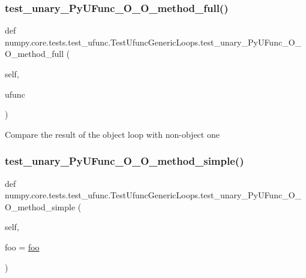 \subsubsection{\texorpdfstring{test\+\_\+unary\+\_\+\+Py\+U\+Func\+\_\+\+O\+\_\+\+O\+\_\+method\+\_\+full()}{test\_unary\_PyUFunc\_O\_O\_method\_full()}}
{\footnotesize\ttfamily def numpy.\+core.\+tests.\+test\+\_\+ufunc.\+Test\+Ufunc\+Generic\+Loops.\+test\+\_\+unary\+\_\+\+Py\+U\+Func\+\_\+\+O\+\_\+\+O\+\_\+method\+\_\+full (\begin{DoxyParamCaption}\item[{}]{self,  }\item[{}]{ufunc }\end{DoxyParamCaption})}

\begin{DoxyVerb}Compare the result of the object loop with non-object one\end{DoxyVerb}
 \mbox{\label{classnumpy_1_1core_1_1tests_1_1test__ufunc_1_1TestUfuncGenericLoops_a439efc5901727ff98d2fb9d46699e28a}} 
\subsubsection{\texorpdfstring{test\+\_\+unary\+\_\+\+Py\+U\+Func\+\_\+\+O\+\_\+\+O\+\_\+method\+\_\+simple()}{test\_unary\_PyUFunc\_O\_O\_method\_simple()}}
{\footnotesize\ttfamily def numpy.\+core.\+tests.\+test\+\_\+ufunc.\+Test\+Ufunc\+Generic\+Loops.\+test\+\_\+unary\+\_\+\+Py\+U\+Func\+\_\+\+O\+\_\+\+O\+\_\+method\+\_\+simple (\begin{DoxyParamCaption}\item[{}]{self,  }\item[{}]{foo = {\ttfamily \hyperlink{classnumpy_1_1core_1_1tests_1_1test__ufunc_1_1TestUfuncGenericLoops_1_1foo}{foo}} }\end{DoxyParamCaption})}



